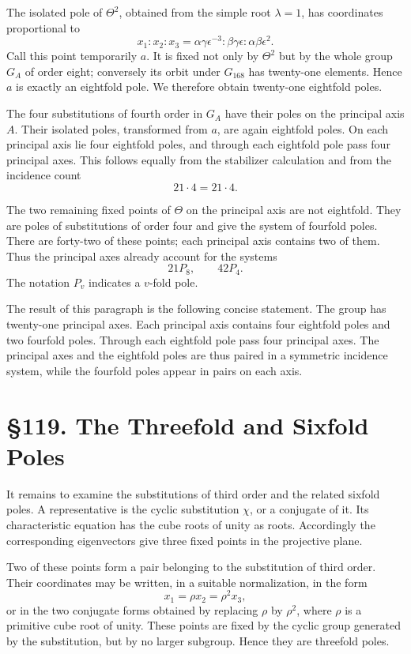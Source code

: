 \documentclass[12pt,a4paper]{article}
\newcommand{\webersection}[2]{\clearpage\section*{\S #1. #2}\addcontentsline{toc}{section}{\S #1. #2}}
\begin{document}
The isolated pole of \(\Theta^2\), obtained from the simple root \(\lambda=1\), has coordinates proportional to
\[
 x_1:x_2:x_3=\alpha\gamma\epsilon^{-3}:
              \beta\gamma\epsilon:
              \alpha\beta\epsilon^{2}.
\]
Call this point temporarily \(a\).  It is fixed not only by \(\Theta^2\) but by the whole group \(G_A\) of order eight; conversely its orbit under \(G_{168}\) has twenty-one elements.  Hence \(a\) is exactly an eightfold pole.  We therefore obtain twenty-one eightfold poles.

The four substitutions of fourth order in \(G_A\) have their poles on the principal axis \(A\).  Their isolated poles, transformed from \(a\), are again eightfold poles.  On each principal axis lie four eightfold poles, and through each eightfold pole pass four principal axes.  This follows equally from the stabilizer calculation and from the incidence count
\[
21\cdot 4=21\cdot 4.
\]

The two remaining fixed points of \(\Theta\) on the principal axis are not eightfold.  They are poles of substitutions of order four and give the system of fourfold poles.  There are forty-two of these points; each principal axis contains two of them.  Thus the principal axes already account for the systems
\[
21P_8,
\qquad 42P_4.
\]
The notation \(P_v\) indicates a \(v\)-fold pole.

The result of this paragraph is the following concise statement.  The group has twenty-one principal axes.  Each principal axis contains four eightfold poles and two fourfold poles.  Through each eightfold pole pass four principal axes.  The principal axes and the eightfold poles are thus paired in a symmetric incidence system, while the fourfold poles appear in pairs on each axis.

\webersection{119}{The Threefold and Sixfold Poles}

It remains to examine the substitutions of third order and the related sixfold poles.  A representative is the cyclic substitution \(\chi\), or a conjugate of it.  Its characteristic equation has the cube roots of unity as roots.  Accordingly the corresponding eigenvectors give three fixed points in the projective plane.

Two of these points form a pair belonging to the substitution of third order.  Their coordinates may be written, in a suitable normalization, in the form
\[
 x_1=\rho x_2=\rho^2x_3,
\]
or in the two conjugate forms obtained by replacing \(\rho\) by \(\rho^2\), where \(\rho\) is a primitive cube root of unity.  These points are fixed by the cyclic group generated by the substitution, but by no larger subgroup.  Hence they are threefold poles.
\end{document}
